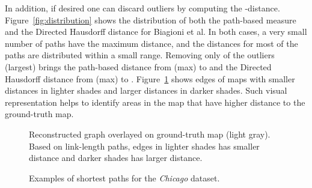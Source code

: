 \documentclass[natbib]{svjour3}                    \smartqed  \usepackage[table]{xcolor}
\begin{document}
In addition, if desired one can discard outliers by computing the -distance. Figure~\ref{fig:distribution} shows the distribution of both the path-based measure and the Directed Hausdorff distance for Biagioni et al. In both cases, a very small number of paths have the maximum distance, and the distances for most of the paths are distributed within a small range. Removing only  of the outliers (largest) brings the path-based distance from  (max) to  and the Directed Hausdorff distance from  (max) to . 
Figure~\ref{fig:rmapjames} shows edges of maps with smaller distances in lighter shades and larger distances in darker shades.
Such visual representation helps to identify areas in the map that have higher distance to the ground-truth map.


\begin{figure}[htbp]
\begin{center}

\end{center}
\vspace*{-2ex}
\caption{Reconstructed graph overlayed on ground-truth map (light gray). Based on link-length  paths, edges in lighter shades has smaller distance and darker shades has larger distance.}
\label{fig:rmapjames}
\end{figure}
 

\begin{figure}[bthp]
\begin{center}
\hspace{0.05cm}
\hspace{0.05cm}
\hspace{0.05cm}
\end{center}
\caption{Examples of shortest paths for the \emph{Chicago} dataset.}
\label{fig:rn_sp_all}
\end{figure} 
\end{document}
